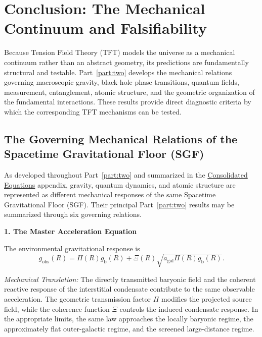 \chapter{Conclusion: The Mechanical Continuum and Falsifiability}
\label{chap:falsifiability}

Because Tension Field Theory (TFT) models the universe as a mechanical continuum rather than an abstract geometry, its predictions are fundamentally structural and testable. Part~\ref{part:two} develops the mechanical relations governing macroscopic gravity, black-hole phase transitions, quantum fields, measurement, entanglement, atomic structure, and the geometric organization of the fundamental interactions. These results provide direct diagnostic criteria by which the corresponding TFT mechanisms can be tested.


\section{The Governing Mechanical Relations of the Spacetime Gravitational Floor (SGF)}

As developed throughout Part~\ref{part:two} and summarized in the \hyperref[app:consolidated_equations]{Consolidated Equations} appendix, gravity, quantum dynamics, and atomic structure are represented as different mechanical responses of the same Spacetime Gravitational Floor (SGF). Their principal Part~\ref{part:two} results may be summarized through six governing relations.


\vspace{0.5em}
\noindent\textbf{1. The Master Acceleration Equation}

The environmental gravitational response is
\begin{equation}
    g_{\mathrm{obs}}(R)
    =
    \Pi(R)g_{\mathrm b}(R)
    +
    \Xi(R)
    \sqrt{
        a_{\mathrm{gal}}
        \Pi(R)g_{\mathrm b}(R)
    }.
\end{equation}

\textit{Mechanical Translation:}
The directly transmitted baryonic field and the coherent reactive response of the interstitial condensate contribute to the same observable acceleration. The geometric transmission factor $\Pi$ modifies the projected source field, while the coherence function $\Xi$ controls the induced condensate response. In the appropriate limits, the same law approaches the locally baryonic regime, the approximately flat outer-galactic regime, and the screened large-distance regime.


